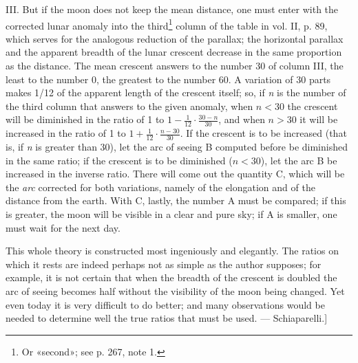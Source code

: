 \documentclass[11pt]{article}
\begin{document}
\par III. But if the moon does not keep the mean distance, one must enter with the corrected lunar anomaly into the third\footnote{Or «second»; see p. 267, note 1.} column of the table in vol. II, p. 89, which serves for the analogous reduction of the parallax; the horizontal parallax and the apparent breadth of the lunar crescent decrease in the same proportion as the distance. The mean crescent answers to the number 30 of column III, the least to the number 0, the greatest to the number 60. A variation of 30 parts makes 1/12 of the apparent length of the crescent itself; so, if \emph{n} is the number of the third column that answers to the given anomaly, when $n < 30$ the crescent will be diminished in the ratio of 1 to $1 - \frac{1}{12}\cdot\frac{30 - n}{30}$, and when $n > 30$ it will be increased in the ratio of 1 to $1 + \frac{1}{12}\cdot\frac{n - 30}{30}$. If the crescent is to be increased (that is, if \emph{n} is greater than 30), let the arc of seeing B computed before be diminished in the same ratio; if the crescent is to be diminished ($n < 30$), let the arc B be increased in the inverse ratio. There will come out the quantity C, which will be the \emph{arc} corrected for both variations, namely of the elongation and of the distance from the earth. With C, lastly, the number A must be compared; if this is greater, the moon will be visible in a clear and pure sky; if A is smaller, one must wait for the next day.\par
\par This whole theory is constructed most ingeniously and elegantly. The ratios on which it rests are indeed perhaps not as simple as the author supposes; for example, it is not certain that when the breadth of the crescent is doubled the arc of seeing becomes half without the visibility of the moon being changed. Yet even today it is very difficult to do better; and many observations would be needed to determine well the true ratios that must be used. — Schiaparelli.]\par
\end{document}
